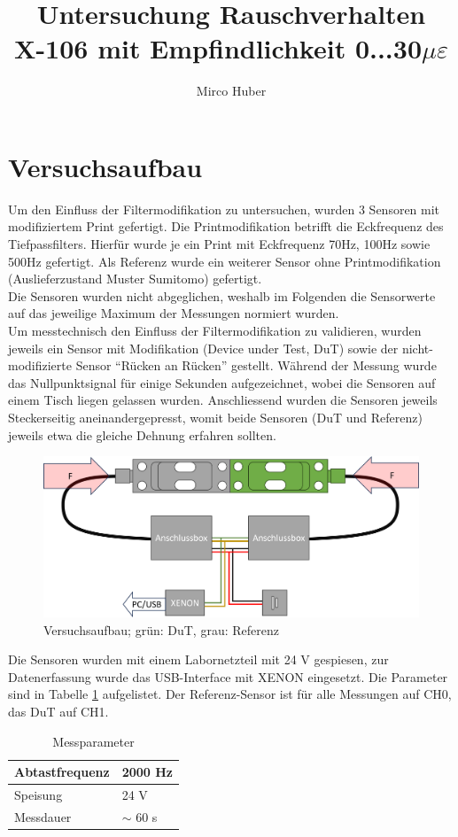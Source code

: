 \documentclass[12pt,a4paper]{article}
\title{Untersuchung Rauschverhalten\\[3ex] \small{ X-106 mit Empfindlichkeit 0...30$\mu\varepsilon$}}
\author{Mirco Huber}
\begin{document}
	\maketitle
	\newpage
	\section{Versuchsaufbau}
Um den Einfluss der Filtermodifikation zu untersuchen, wurden 3 Sensoren mit modifiziertem Print gefertigt. Die Printmodifikation betrifft die Eckfrequenz des Tiefpassfilters. Hierfür wurde je ein Print mit Eckfrequenz 70Hz, 100Hz sowie 500Hz gefertigt. Als Referenz wurde ein weiterer Sensor ohne Printmodifikation (Auslieferzustand Muster Sumitomo) gefertigt.\\
Die Sensoren wurden nicht abgeglichen, weshalb im Folgenden die Sensorwerte auf das jeweilige Maximum der Messungen normiert wurden.\\
Um messtechnisch den Einfluss der Filtermodifikation zu validieren, wurden jeweils ein Sensor mit Modifikation (Device under Test, DuT) sowie der nicht-modifizierte Sensor  ``Rücken an Rücken'' gestellt. Während der Messung wurde das Nullpunktsignal für einige Sekunden aufgezeichnet, wobei die Sensoren auf einem Tisch liegen gelassen wurden. Anschliessend wurden die Sensoren jeweils Steckerseitig aneinandergepresst, womit beide Sensoren (DuT und Referenz) jeweils etwa die gleiche Dehnung erfahren sollten. 
	\begin{figure}[H]
		\centering
		\includegraphics[width=1\linewidth]{Aufbau}
		\caption{Versuchsaufbau; grün: DuT, grau: Referenz}
		\label{fig:screenshot001}
	\end{figure}
\noindent Die Sensoren wurden mit einem Labornetzteil mit 24 V gespiesen, zur Datenerfassung wurde das USB-Interface mit XENON eingesetzt. Die Parameter sind in Tabelle \ref{tab:params} aufgelistet. Der Referenz-Sensor ist für alle Messungen auf CH0, das DuT auf CH1.
	\begin{table}[H]
		\centering
		\caption{Messparameter}
	\begin{tabular}{l|l}
		Abtastfrequenz & 2000 Hz \\
		\hline
		Speisung & 24 V \\
		\hline
		Messdauer & $\sim$ 60 s \\
	\end{tabular}	
	\label{tab:params}
	\end{table}
\end{document}
